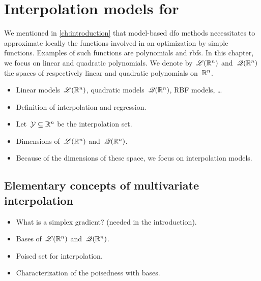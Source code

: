 %
%
%
\chapter{Interpolation models for }

We mentioned in \cref{ch:introduction} that model-based \gls{dfo} methods necessitates to approximate locally the functions involved in an optimization by simple functions.
Examples of such functions are polynomials and \glspl{rbf}.
In this chapter, we focus on linear and quadratic polynomials.
We denote by~$\mathscr{L}(\mathbb{R}^n)$ and~$\mathscr{Q}(\mathbb{R}^n)$ the spaces of respectively linear and quadratic polynomials on~$\mathbb{R}^n$.

\begin{itemize}
    \item Linear models~$\mathscr{L}(\mathbb{R}^n)$, quadratic models~$\mathscr{Q}(\mathbb{R}^n)$, RBF models, \dots
    \item Definition of interpolation and regression.
    \item Let~$\mathcal{Y} \subseteq \mathbb{R}^n$ be the interpolation set.
    \item Dimensions of~$\mathscr{L}(\mathbb{R}^n)$ and~$\mathscr{Q}(\mathbb{R}^n)$.
    \item Because of the dimensions of these space, we focus on interpolation models.
\end{itemize}

\section{Elementary concepts of multivariate interpolation}
\label{sec:multivariate-interpolation}

\begin{itemize}
    \item What is a simplex gradient? (needed in the introduction).
    \item Bases of~$\mathscr{L}(\mathbb{R}^n)$ and~$\mathscr{Q}(\mathbb{R}^n)$.
    \item Poised set for interpolation.
    \item Characterization of the poisedness with bases.
\end{itemize}

